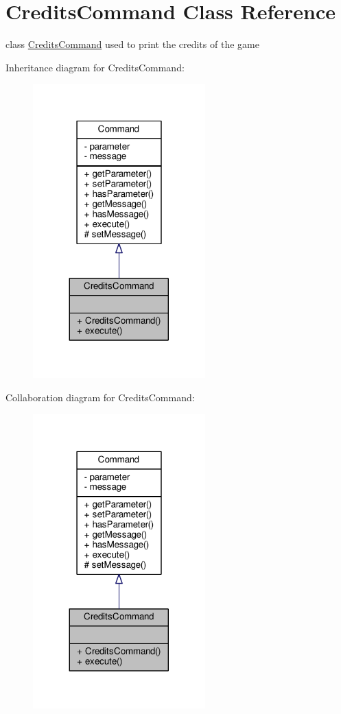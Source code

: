 \hypertarget{classCreditsCommand}{\section{Credits\-Command Class Reference}
\label{classCreditsCommand}
}


class \hyperlink{classCreditsCommand}{Credits\-Command} used to print the credits of the game  




Inheritance diagram for Credits\-Command\-:
\nopagebreak
\begin{figure}[H]
\begin{center}
\leavevmode
\includegraphics[width=188pt]{classCreditsCommand__inherit__graph}
\end{center}
\end{figure}


Collaboration diagram for Credits\-Command\-:
\nopagebreak
\begin{figure}[H]
\begin{center}
\leavevmode
\includegraphics[width=188pt]{classCreditsCommand__coll__graph}
\end{center}
\end{figure}
